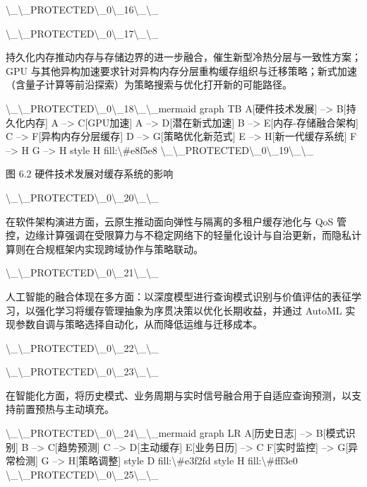 \textbackslash{}_\textbackslash{}_PROTECTED\textbackslash{}_0\textbackslash{}_16\textbackslash{}_\textbackslash{}_

\textbackslash{}_\textbackslash{}_PROTECTED\textbackslash{}_0\textbackslash{}_17\textbackslash{}_\textbackslash{}_

持久化内存推动内存与存储边界的进一步融合，催生新型冷热分层与一致性方案；GPU 与其他异构加速要求针对异构内存分层重构缓存组织与迁移策略；新式加速（含量子计算等前沿探索）为策略搜索与优化打开新的可能路径。

\textbackslash{}_\textbackslash{}_PROTECTED\textbackslash{}_0\textbackslash{}_18\textbackslash{}_\textbackslash{}_mermaid
graph TB
    A[硬件技术发展] --> B[持久化内存]
    A --> C[GPU加速]
    A --> D[潜在新式加速]
    B --> E[内存-存储融合架构]
    C --> F[异构内存分层缓存]
    D --> G[策略优化新范式]
    E --> H[新一代缓存系统]
    F --> H
    G --> H
    style H fill:\textbackslash{}#e8f5e8
\textbackslash{}_\textbackslash{}_PROTECTED\textbackslash{}_0\textbackslash{}_19\textbackslash{}_\textbackslash{}_

图 6.2 硬件技术发展对缓存系统的影响

\textbackslash{}_\textbackslash{}_PROTECTED\textbackslash{}_0\textbackslash{}_20\textbackslash{}_\textbackslash{}_

在软件架构演进方面，云原生推动面向弹性与隔离的多租户缓存池化与 QoS 管控，边缘计算强调在受限算力与不稳定网络下的轻量化设计与自治更新，而隐私计算则在合规框架内实现跨域协作与策略联动。

\textbackslash{}_\textbackslash{}_PROTECTED\textbackslash{}_0\textbackslash{}_21\textbackslash{}_\textbackslash{}_

人工智能的融合体现在多方面：以深度模型进行查询模式识别与价值评估的表征学习，以强化学习将缓存管理抽象为序贯决策以优化长期收益，并通过 AutoML 实现参数自调与策略选择自动化，从而降低运维与迁移成本。

\textbackslash{}_\textbackslash{}_PROTECTED\textbackslash{}_0\textbackslash{}_22\textbackslash{}_\textbackslash{}_

\textbackslash{}_\textbackslash{}_PROTECTED\textbackslash{}_0\textbackslash{}_23\textbackslash{}_\textbackslash{}_

在智能化方面，将历史模式、业务周期与实时信号融合用于自适应查询预测，以支持前置预热与主动填充。

\textbackslash{}_\textbackslash{}_PROTECTED\textbackslash{}_0\textbackslash{}_24\textbackslash{}_\textbackslash{}_mermaid
graph LR
    A[历史日志] --> B[模式识别]
    B --> C[趋势预测]
    C --> D[主动缓存]
    E[业务日历] --> C
    F[实时监控] --> G[异常检测]
    G --> H[策略调整]
    style D fill:\textbackslash{}#e3f2fd
    style H fill:\textbackslash{}#fff3e0
\textbackslash{}_\textbackslash{}_PROTECTED\textbackslash{}_0\textbackslash{}_25\textbackslash{}_\textbackslash{}_

